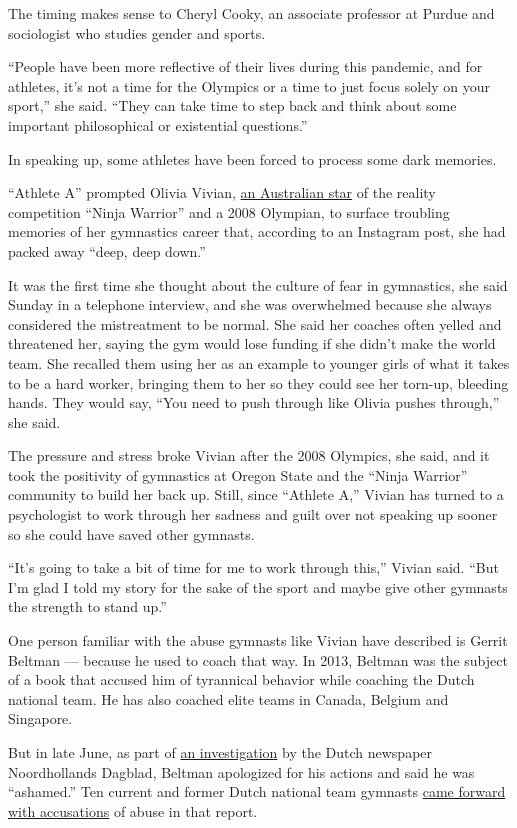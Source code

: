 The timing makes sense to Cheryl Cooky, an associate professor at Purdue
and sociologist who studies gender and sports.

``People have been more reflective of their lives during this pandemic,
and for athletes, it's not a time for the Olympics or a time to just
focus solely on your sport,'' she said. ``They can take time to step
back and think about some important philosophical or existential
questions.''

In speaking up, some athletes have been forced to process some dark
memories.

``Athlete A'' prompted Olivia Vivian,
\href{https://www.youtube.com/watch?v=1WZPvwQf9AU}{an Australian star}
of the reality competition ``Ninja Warrior'' and a 2008 Olympian, to
surface troubling memories of her gymnastics career that, according to
an Instagram post, she had packed away ``deep, deep down.''

It was the first time she thought about the culture of fear in
gymnastics, she said Sunday in a telephone interview, and she was
overwhelmed because she always considered the mistreatment to be normal.
She said her coaches often yelled and threatened her, saying the gym
would lose funding if she didn't make the world team. She recalled them
using her as an example to younger girls of what it takes to be a hard
worker, bringing them to her so they could see her torn-up, bleeding
hands. They would say, ``You need to push through like Olivia pushes
through,'' she said.

The pressure and stress broke Vivian after the 2008 Olympics, she said,
and it took the positivity of gymnastics at Oregon State and the ``Ninja
Warrior'' community to build her back up. Still, since ``Athlete A,''
Vivian has turned to a psychologist to work through her sadness and
guilt over not speaking up sooner so she could have saved other
gymnasts.

``It's going to take a bit of time for me to work through this,'' Vivian
said. ``But I'm glad I told my story for the sake of the sport and maybe
give other gymnasts the strength to stand up.''

One person familiar with the abuse gymnasts like Vivian have described
is Gerrit Beltman --- because he used to coach that way. In 2013,
Beltman was the subject of a book that accused him of tyrannical
behavior while coaching the Dutch national team. He has also coached
elite teams in Canada, Belgium and Singapore.

But in late June, as part of
\href{https://www.noordhollandsdagblad.nl/cnt/dmf20200724_98276713/turncoach-gerrit-beltman-verbreekt-stilzwijgen-over-zijn-onmenselijke-trainingsmethoden-ik-mishandelde-en-vernederde-jonge-turnsters-om-medailles-te-w?utm_source=google\&utm_medium=organic}{an
investigation} by the Dutch newspaper Noordhollands Dagblad, Beltman
apologized for his actions and said he was ``ashamed.'' Ten current and
former Dutch national team gymnasts
\href{https://nltimes.nl/2020/07/25/top-gymnastics-coach-acknowledges-history-abuse-mistreatment}{came
forward with accusations} of abuse in that report.

